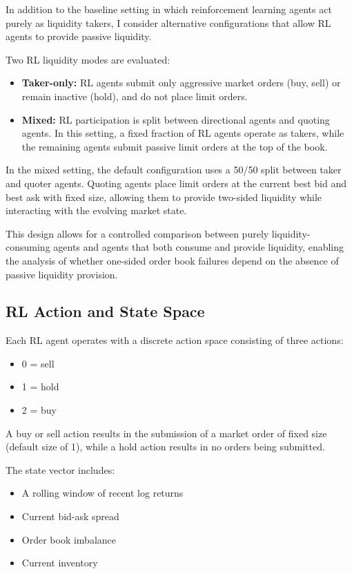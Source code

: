 \documentclass[sigconf]{acmart}
\begin{document}
In addition to the baseline setting in which reinforcement learning agents act purely as liquidity takers, I consider alternative configurations that allow RL agents to provide passive liquidity.

Two RL liquidity modes are evaluated:
\begin{itemize}[leftmargin=1.5em]
    \item \textbf{Taker-only:} RL agents submit only aggressive market orders (buy, sell) or remain inactive (hold), and do not place limit orders.
    \item \textbf{Mixed:} RL participation is split between directional agents and quoting agents. In this setting, a fixed fraction of RL agents operate as takers, while the remaining agents submit passive limit orders at the top of the book.
\end{itemize}

In the mixed setting, the default configuration uses a 50/50 split between taker and quoter agents. Quoting agents place limit orders at the current best bid and best ask with fixed size, allowing them to provide two-sided liquidity while interacting with the evolving market state.

This design allows for a controlled comparison between purely liquidity-consuming agents and agents that both consume and provide liquidity, enabling the analysis of whether one-sided order book failures depend on the absence of passive liquidity provision.

\subsection{RL Action and State Space}

Each RL agent operates with a discrete action space consisting of three actions:
\begin{itemize}[leftmargin=1.5em]
    \item 0 = sell
    \item 1 = hold
    \item 2 = buy
\end{itemize}

A buy or sell action results in the submission of a market order of fixed size (default size of 1), while a hold action results in no orders being submitted.

The state vector includes:
\begin{itemize}[leftmargin=1.5em]
    \item A rolling window of recent log returns
    \item Current bid-ask spread
    \item Order book imbalance
    \item Current inventory
\end{itemize}
\end{document}
